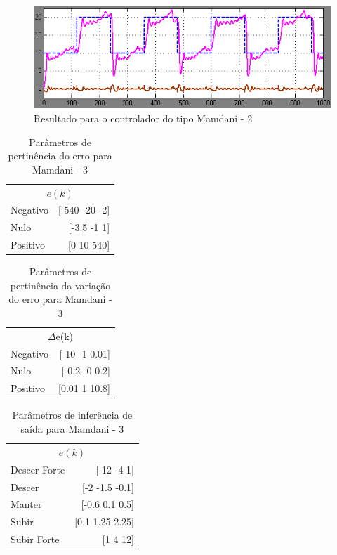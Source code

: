 \documentclass[conference]{IEEEtran}
\begin{document}
\begin{figure}[!h]
    \centering
    \includegraphics[scale=0.2]{mamdani2.png}
    \caption { Resultado para o controlador do tipo Mamdani - 2}
\end{figure}


\begin{table}[!h]
\caption{Parâmetros de pertinência do erro para Mamdani - 3}
\centering
\begin{tabular}{lr}
\toprule
\multicolumn{2}{c}{$e(k)$} \\
\cmidrule(r){1-2}
Negativo & [-540 -20 -2] \\
Nulo & [-3.5 -1 1] \\
Positivo & [0 10 540] \\
\bottomrule
\end{tabular}
\end{table}

\begin{table}[!h]
\caption{Parâmetros de pertinência da variação do erro para Mamdani - 3}
\centering
\begin{tabular}{lr}
\toprule
\multicolumn{2}{c}{$\Delta$e(k)} \\
\cmidrule(r){1-2}
Negativo & [-10 -1 0.01] \\
Nulo & [-0.2 -0 0.2] \\
Positivo & [0.01 1 10.8] \\
\bottomrule
\end{tabular}
\end{table}

\begin{table}[!h]
\caption{Parâmetros de inferência de saída para Mamdani - 3}
\centering
\begin{tabular}{lr}
\toprule
\multicolumn{2}{c}{$e(k)$} \\
\cmidrule(r){1-2}
Descer Forte & [-12 -4 1] \\
Descer & [-2 -1.5 -0.1] \\
Manter & [-0.6 0.1 0.5] \\
Subir & [0.1 1.25 2.25] \\
Subir Forte & [1 4 12] \\
\bottomrule
\end{tabular}
\end{table}
\end{document}
